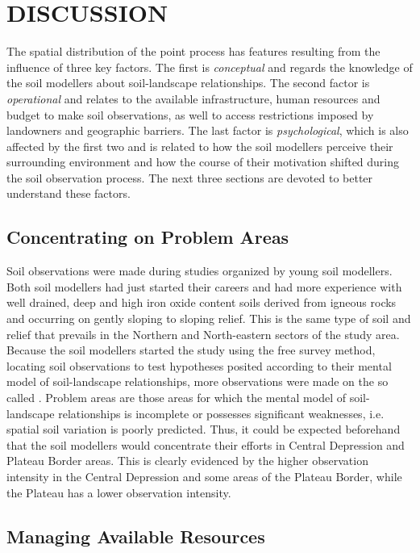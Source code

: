\section{DISCUSSION}

The spatial distribution of the point process has features resulting from the influence of three key factors. 
The first is \textit{conceptual} and regards the knowledge of the soil modellers about soil-landscape 
relationships. The second factor is \textit{operational} and relates to the available infrastructure, human 
resources and budget to make soil observations, as well to access restrictions imposed by landowners and 
geographic barriers. The last factor is \textit{psychological}, which is also affected by the first two and is 
related to how the soil modellers perceive their surrounding environment and how the course of their 
motivation shifted during the soil observation process. The next three sections are devoted to better 
understand these factors.

\subsection{Concentrating on Problem Areas}
\label{subsec:chap07-conceptual}

Soil observations were made during studies organized by young soil modellers. Both soil modellers had just 
started their careers and had more experience with well drained, deep and high iron oxide content soils 
derived from igneous rocks and occurring on gently sloping to sloping relief. This is the same type of soil 
and relief that prevails in the Northern and North-eastern sectors of the study area. Because the soil 
modellers started the study using the free survey method, locating soil observations to test hypotheses 
posited according to their mental model of soil-landscape relationships, more observations were made on the so 
called  \cite{Rossiter2000}. Problem areas are those areas for which the mental model of 
soil-landscape relationships is incomplete or possesses significant weaknesses, i.e. spatial soil variation is 
poorly predicted. Thus, it could be expected beforehand that the soil modellers would concentrate their 
efforts in Central Depression and Plateau Border areas. This is clearly evidenced by the higher observation 
intensity in the Central Depression and some areas of the Plateau Border, while the Plateau has a lower 
observation intensity.

\subsection{Managing Available Resources}

